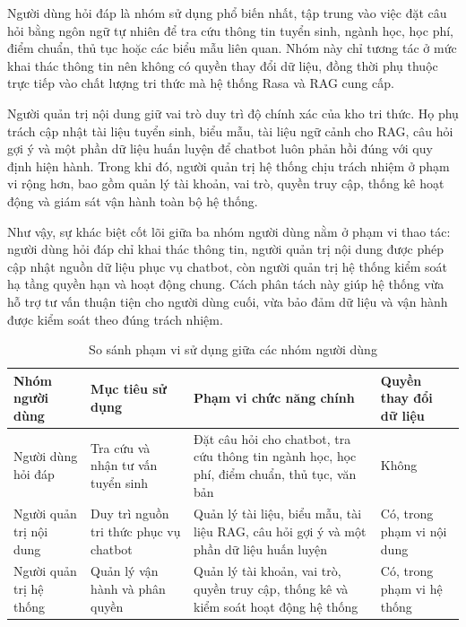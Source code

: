 \documentclass[12pt,a4paper]{report}
\begin{document}
Người dùng hỏi đáp là nhóm sử dụng phổ biến nhất, tập trung vào việc đặt câu hỏi bằng ngôn ngữ tự nhiên để tra cứu thông tin tuyển sinh, ngành học, học phí, điểm chuẩn, thủ tục hoặc các biểu mẫu liên quan. Nhóm này chỉ tương tác ở mức khai thác thông tin nên không có quyền thay đổi dữ liệu, đồng thời phụ thuộc trực tiếp vào chất lượng tri thức mà hệ thống Rasa và RAG cung cấp.

Người quản trị nội dung giữ vai trò duy trì độ chính xác của kho tri thức. Họ phụ trách cập nhật tài liệu tuyển sinh, biểu mẫu, tài liệu ngữ cảnh cho RAG, câu hỏi gợi ý và một phần dữ liệu huấn luyện để chatbot luôn phản hồi đúng với quy định hiện hành. Trong khi đó, người quản trị hệ thống chịu trách nhiệm ở phạm vi rộng hơn, bao gồm quản lý tài khoản, vai trò, quyền truy cập, thống kê hoạt động và giám sát vận hành toàn bộ hệ thống.

Như vậy, sự khác biệt cốt lõi giữa ba nhóm người dùng nằm ở phạm vi thao tác: người dùng hỏi đáp chỉ khai thác thông tin, người quản trị nội dung được phép cập nhật nguồn dữ liệu phục vụ chatbot, còn người quản trị hệ thống kiểm soát hạ tầng quyền hạn và hoạt động chung. Cách phân tách này giúp hệ thống vừa hỗ trợ tư vấn thuận tiện cho người dùng cuối, vừa bảo đảm dữ liệu và vận hành được kiểm soát theo đúng trách nhiệm.

\begin{table}[H]
    \centering
    \caption{So sánh phạm vi sử dụng giữa các nhóm người dùng}
    \small
    \begin{tabularx}{\textwidth}{|p{3cm}|p{3cm}|X|p{2.5cm}|}
        \hline
        \textbf{Nhóm người dùng} & \textbf{Mục tiêu sử dụng} & \textbf{Phạm vi chức năng chính} & \textbf{Quyền thay đổi dữ liệu} \\ \hline
        Người dùng hỏi đáp & Tra cứu và nhận tư vấn tuyển sinh & Đặt câu hỏi cho chatbot, tra cứu thông tin ngành học, học phí, điểm chuẩn, thủ tục, văn bản & Không \\ \hline
        Người quản trị nội dung & Duy trì nguồn tri thức phục vụ chatbot & Quản lý tài liệu, biểu mẫu, tài liệu RAG, câu hỏi gợi ý và một phần dữ liệu huấn luyện & Có, trong phạm vi nội dung \\ \hline
        Người quản trị hệ thống & Quản lý vận hành và phân quyền & Quản lý tài khoản, vai trò, quyền truy cập, thống kê và kiểm soát hoạt động hệ thống & Có, trong phạm vi hệ thống \\ \hline
    \end{tabularx}
\end{table}
\end{document}
